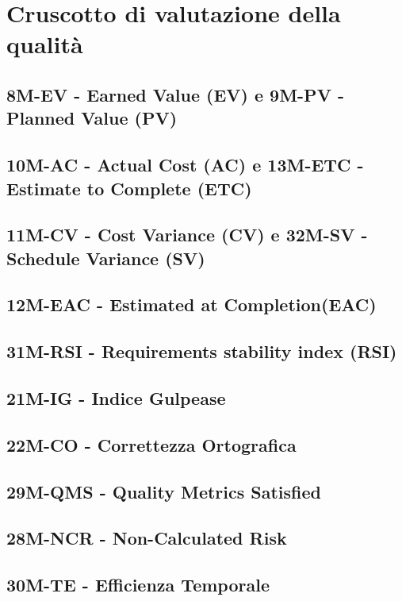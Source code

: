 \section{Cruscotto di valutazione della qualità}
\subsection{8M-EV - Earned Value (EV) e 9M-PV - Planned Value (PV)}
\subsection{10M-AC - Actual Cost (AC) e 13M-ETC - Estimate to Complete (ETC)}
\subsection{11M-CV - Cost Variance (CV) e 32M-SV - Schedule Variance (SV)}
\subsection{12M-EAC - Estimated at Completion(EAC)}
\subsection{31M-RSI - Requirements stability index (RSI)}
\subsection{21M-IG - Indice Gulpease}
\subsection{22M-CO - Correttezza Ortografica}
\subsection{29M-QMS - Quality Metrics Satisfied}
\subsection{28M-NCR - Non-Calculated Risk}
\subsection{30M-TE - Efficienza Temporale}
